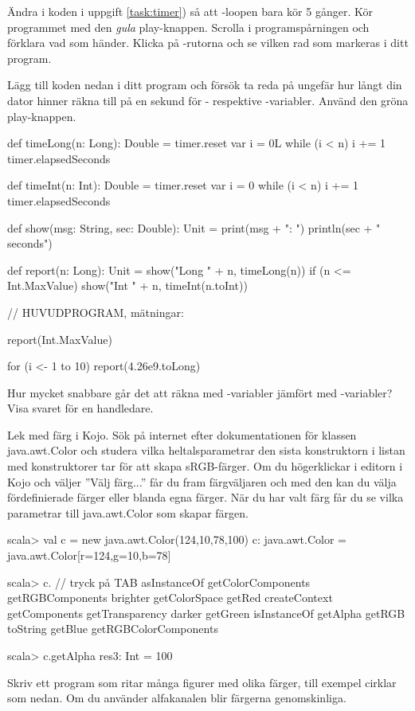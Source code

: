 \Subtask Ändra i koden i uppgift \ref{task:timer}) så att -loopen bara kör 5 gånger. Kör programmet med den \emph{gula} play-knappen. Scrolla i programspårningen och förklara vad som händer. Klicka på -rutorna och se vilken rad som markeras i ditt program.

\Subtask Lägg till koden nedan i ditt program och försök ta reda på ungefär hur långt din dator hinner räkna till på en sekund för - respektive -variabler. Använd den gröna play-knappen.
\begin{Code}
def timeLong(n: Long): Double = {
  timer.reset
  var i = 0L
  while (i < n) { i += 1 }
  timer.elapsedSeconds
}

def timeInt(n: Int): Double = {
  timer.reset
  var i = 0
  while (i < n) { i += 1 }
  timer.elapsedSeconds
}

def show(msg: String, sec: Double): Unit = {
  print(msg + ": ")
  println(sec + " seconds")
}

def report(n: Long): Unit = {
  show("Long " + n, timeLong(n))
  if (n <= Int.MaxValue) show("Int  " + n, timeInt(n.toInt))
}

// HUVUDPROGRAM, mätningar:

report(Int.MaxValue)

for (i <- 1 to 10) {
  report(4.26e9.toLong)
}
\end{Code}

\Subtask\Checkpoint Hur mycket snabbare går det att räkna med -variabler jämfört med -variabler? Visa svaret för en handledare.

\Task Lek med färg i Kojo. Sök på internet efter dokumentationen för klassen java.awt.Color och studera vilka heltalsparametrar den sista konstruktorn i listan med konstruktorer tar för att skapa sRGB-färger. Om du högerklickar i editorn i Kojo och väljer ''Välj färg...'' får du fram färgväljaren och med den kan du välja fördefinierade färger eller blanda egna färger. När du har valt färg får du se vilka parametrar till java.awt.Color som skapar färgen. 

\begin{REPL}
scala> val c = new java.awt.Color(124,10,78,100)
c: java.awt.Color = java.awt.Color[r=124,g=10,b=78]

scala> c.  // tryck på TAB
asInstanceOf    getColorComponents      getRGBComponents
brighter        getColorSpace           getRed
createContext   getComponents           getTransparency
darker          getGreen                isInstanceOf
getAlpha        getRGB                  toString
getBlue         getRGBColorComponents

scala> c.getAlpha
res3: Int = 100
\end{REPL}
Skriv ett program som ritar många figurer med olika färger, till exempel cirklar som nedan. Om du använder alfakanalen blir färgerna genomskinliga.
 

